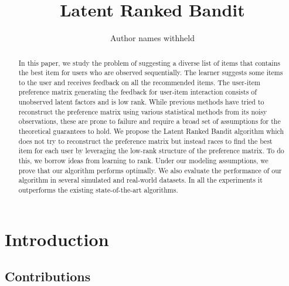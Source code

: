\documentclass[letterpaper]{article} %
\newcommand{\todob}[2][]{\todo[color=cyan!20,size=\tiny,inline,#1]{B: #2}} %
\newcommand{\todosb}[2][]{\todo[color=green!20,size=\tiny,inline, #1]{S: #2}} %
\begin{document}
%
\title{Latent Ranked Bandit}
\author{Author names withheld}
\maketitle
\begin{abstract}
In this paper, we study the problem of suggesting  a diverse list of items that contains the best item  for users who are observed sequentially. The learner suggests some items to the user and receives feedback on all the recommended items. The user-item preference matrix generating the feedback for user-item interaction consists of unobserved latent factors and is low rank. While previous methods have tried to reconstruct the preference matrix using various statistical methods from its noisy observations, these are prone to failure and require a broad set of assumptions for the theoretical guarantees to hold. We propose the Latent Ranked Bandit algorithm which does not try to reconstruct the preference matrix but instead races to find the best item for each user by leveraging the low-rank structure of the preference matrix. To do this, we borrow ideas from learning to rank. Under our modeling assumptions, we prove that our algorithm performs optimally. We also evaluate the performance of our algorithm in several simulated and real-world datasets. In all the experiments it outperforms the existing state-of-the-art algorithms. 
\end{abstract}


\section{Introduction}
\label{intro}

\subsection{Contributions}
\label{Contribution}

\end{document}
